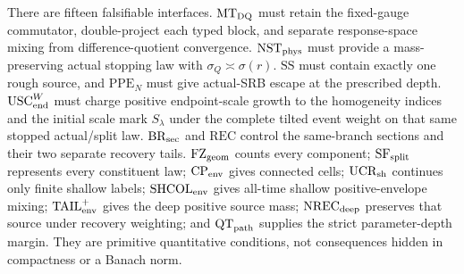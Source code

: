 \documentclass[11pt]{article}
\begin{document}
There are fifteen falsifiable interfaces.  $\mathrm{MT}_{\rm DQ}$ must
retain the fixed-gauge commutator, double-project each typed block, and
separate response-space mixing from difference-quotient convergence.
$\mathrm{NST}_{\rm phys}$ must provide a
mass-preserving actual stopping law with
$\sigma_Q\asymp\sigma(r)$.  $\mathrm{SS}$ must contain exactly one rough source, and
$\mathrm{PPE}_{N}$ must give actual-SRB escape at the prescribed depth.
$\mathrm{USC}_{\rm end}^{W}$ must charge positive endpoint-scale growth to the
homogeneity indices and the initial scale mark $S_\lambda$ under the complete
tilted event weight on that same stopped actual/split law.
$\mathrm{BR}_{\rm sec}$ and $\mathrm{REC}$ control the same-branch
sections and their two separate recovery tails.
$\mathrm{FZ}_{\rm geom}$ counts every component;
$\mathrm{SF}_{\rm split}$ represents every constituent law;
$\mathrm{CP}_{\rm env}$ gives connected cells;
$\mathrm{UCR}_{\rm sh}$ continues only finite shallow labels;
$\mathrm{SHCOL}_{\rm env}$ gives all-time shallow positive-envelope
mixing; $\mathrm{TAIL}_{\rm env}^{+}$ gives the deep positive source mass;
$\mathrm{NREC}_{\rm deep}$ preserves that source under recovery weighting;
and $\mathrm{QT}_{\rm path}$ supplies the strict parameter-depth margin.
They are primitive quantitative conditions, not consequences hidden in
compactness or a Banach norm.
\end{document}
